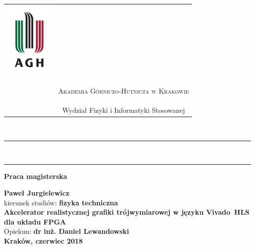 \documentclass[a4paper, 12pt, twoside]{book}
\numberwithin{equation}{section}
\begin{document}
\begin{table}[H]
\resizebox{\textwidth}{!} {
\begin{tabular}{cc}
\multirow{2}{*}{\includegraphics[height=37.5mm]{img/agh.jpg}} & 
\phantom{tmp} \\ 
& \phantom{tmp} \\

& {
\begin{small}
\textsc{Akademia Górniczo-Hutnicza w Krakowie}
\end{small}} \\ 
& {\small{Wydział Fizyki i Informatyki Stosowanej}}
\end{tabular}
}
\end{table}
~\\ %
\rule{\textwidth}{3pt}\\
\rule[2ex]
\textwidth{1pt}\\
\vspace{7ex}
\begin{center}
{\bf\LARGE{Praca magisterska}}\\
\vspace{13ex}




{\bf\Large{Paweł Jurgielewicz}}\\
\vspace{3ex}
{ \small kierunek studiów:} {\bf\normalsize{fizyka techniczna}}\\
\vspace{10ex}
{\bf\large{
Akcelerator realistycznej grafiki trójwymiarowej w języku Vivado~HLS dla układu FPGA
}}\\
\vspace{14ex}
{ \Large {Opiekun:}} {\bf\Large{dr inż. Daniel Lewandowski}}\\
\vspace{18ex}
\bf\large{Kraków, czerwiec 2018}
\end{center}
\newpage
\thispagestyle{empty}
\end{document}
